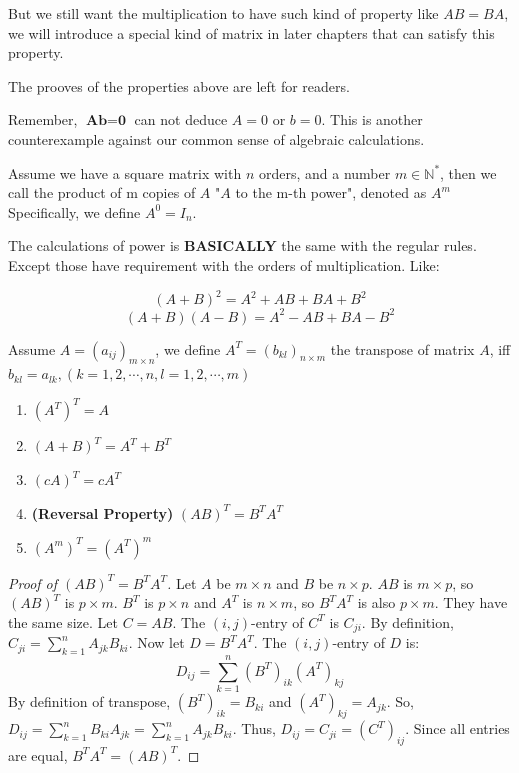 But we still want the multiplication to have such kind of property like $AB = BA$, we will introduce a special kind of matrix in later chapters that can satisfy this property.

The prooves of the properties above are left for readers.

\begin{remark}
Remember, $\textbf{A} \textbf{b} = \textbf{0}$ can not deduce $A=0$ or $b=0$. This is another counterexample against our common sense of algebraic calculations.
\end{remark}

\begin{definition}
Assume we have a square matrix with $n$ orders, and a number $m \in \mathbb{N}^{*}$, then we call the product of m copies of $A$ "$A$ to the m-th power", denoted as $A^m$
Specifically, we define $A^0 = I_n$.
\end{definition}

The calculations of power is \textbf{BASICALLY} the same with the regular rules. Except those have requirement with the orders of multiplication. Like:

\[(A+B)^2 = A^2 + AB + BA + B^2\]
\[(A+B)(A-B) = A^2 - AB + BA - B^2\]

\begin{definition}
Assume $A=(a_{ij})_{m \times n}$, we define $A^T=(b_{kl})_{n \times m}$ the transpose of matrix $A$, iff $b_{kl} = a_{lk}, (k=1,2,\cdots,n,l=1,2,\cdots,m)$
\end{definition}

\begin{property}
\begin{enumerate}
    \item $(A^T)^T = A$
    \item $(A+B)^T = A^T + B^T$
    \item $(cA)^T = cA^T$
    \item \textbf{(Reversal Property)} $(AB)^T = B^T A^T$
    \item $(A^m)^T = (A^T)^m$
\end{enumerate}
\end{property}
\begin{proof}[Proof of $(AB)^T = B^T A^T$]
Let $A$ be $m \times n$ and $B$ be $n \times p$. $AB$ is $m \times p$, so $(AB)^T$ is $p \times m$.
$B^T$ is $p \times n$ and $A^T$ is $n \times m$, so $B^T A^T$ is also $p \times m$. They have the same size.
Let $C = AB$. The $(i, j)$-entry of $C^T$ is $C_{ji}$.
By definition, $C_{ji} = \sum_{k=1}^n A_{jk} B_{ki}$.
Now let $D = B^T A^T$. The $(i, j)$-entry of $D$ is:
\[ D_{ij} = \sum_{k=1}^n (B^T)_{ik} (A^T)_{kj} \]
By definition of transpose, $(B^T)_{ik} = B_{ki}$ and $(A^T)_{kj} = A_{jk}$.
So, $D_{ij} = \sum_{k=1}^n B_{ki} A_{jk} = \sum_{k=1}^n A_{jk} B_{ki}$.
Thus, $D_{ij} = C_{ji} = (C^T)_{ij}$. Since all entries are equal, $B^T A^T = (AB)^T$.
\end{proof}

